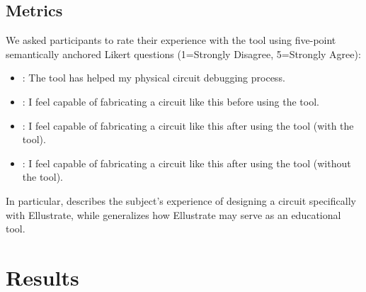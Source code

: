 \documentclass{sigchi}
\begin{document}
\subsection{Metrics}
     We asked participants to rate their experience with the tool using five-point semantically anchored Likert questions (1=Strongly Disagree, 5=Strongly Agree):
    \begin{itemize}
      \item {}: The tool has helped my physical circuit debugging process.
      \item {}: I feel capable of fabricating a circuit like this before using the tool.
      \item {}: I feel capable of fabricating a circuit like this after using the tool (with the tool).
      \item {}: I feel capable of fabricating a circuit like this after using the tool (without the tool).
    \end{itemize}
    In particular,   describes the subject's experience of designing a circuit specifically with Ellustrate, while
     generalizes how Ellustrate may serve as an educational tool.



\section{Results}
\end{document}

